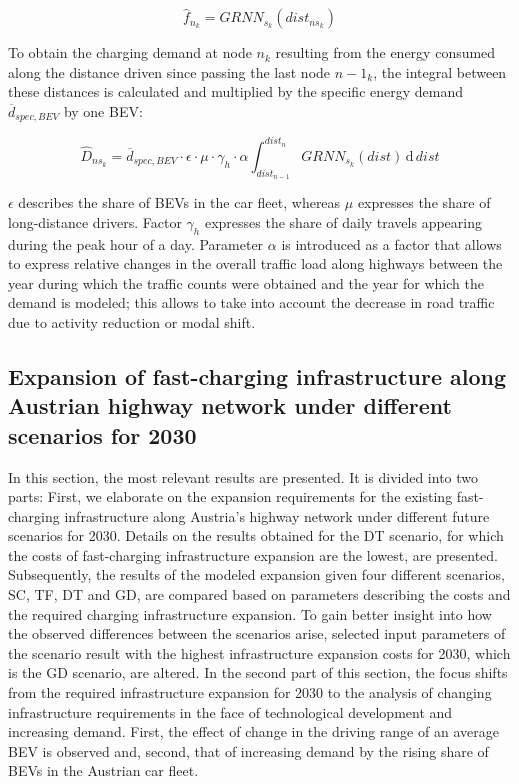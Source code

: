 \begin{equation}
    \hat{f}_{n_k}=GRNN_{s_k} (dist_{ns_k})
\end{equation}

To obtain the charging demand at node $n_k$ resulting from the energy consumed along the distance driven since passing the last node $n-1_k$, the integral between these distances is calculated and multiplied by the specific energy demand $\overline{d}_{spec, BEV}$ by one \ac{BEV}:

\begin{equation}
    \hat{D}_{ns_k} = \overline{d}_{spec, BEV} \cdot \epsilon \cdot \mu \cdot \gamma_h \cdot \alpha \int_{dist_{n-1}}^{dist_n} GRNN_{s_k} (dist) \, \mathrm{d} \, dist
\end{equation}

$\epsilon$ describes the share of \acp{BEV} in the car fleet, whereas $\mu$ expresses the share of long-distance drivers. Factor $\gamma_h$ expresses the share of daily travels appearing during the peak hour of a day. Parameter $\alpha$ is introduced as a factor that allows to express relative changes in the overall traffic load along highways between the year during which the traffic counts were obtained and the year for which the demand is modeled; this allows to take into account the decrease in road traffic due to activity reduction or modal shift.

\subsection{Expansion of fast-charging infrastructure along Austrian highway network under different scenarios for 2030}

In this section, the most relevant results are presented. It is divided into two parts: First, we elaborate on the expansion requirements for the existing fast-charging infrastructure along Austria's highway network under different future scenarios for 2030. Details on the results obtained for the DT scenario, for which the costs of fast-charging infrastructure expansion are the lowest, are presented. Subsequently, the results of the modeled expansion given four different scenarios, SC, TF, DT and GD, are compared based on parameters describing the costs and the required charging infrastructure expansion. To gain better insight into how the observed differences between the scenarios arise,  selected input parameters of the scenario result with the highest infrastructure expansion costs for 2030, which is the GD scenario, are altered. In the second part of this section, the focus shifts from the required infrastructure expansion for 2030 to the analysis of changing infrastructure requirements in the face of technological development and increasing demand. First, the effect of change in the driving range of an average \ac{BEV} is observed and, second, that of increasing demand by the rising share of \acp{BEV} in the Austrian car fleet.

